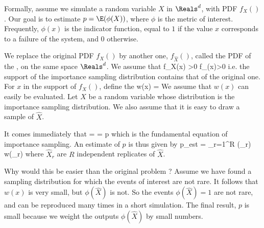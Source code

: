 Formally, assume we simulate a random variable $X$ in $\Reals^d$,
with PDF $f_X()$. Our goal is to estimate $p=\E(\phi(X))$, where
$\phi$ is the metric of interest. Frequently, $\phi(x)$ is the
indicator function, equal to $1$ if the value $x$ corresponds to a
failure of the system, and $0$ otherwise.
\begin{figure}[!htb]
  \centering
{}
   \label{fig-is-ex0}
\end{figure}
We replace the original PDF $f_X()$ by another one, $f_{\hat{X}}()$,
called the PDF of the , on the
same space $\Reals^d$. We assume that
 \ben \mif f_X(x) >0 \mthen f_{}(x)>0
 \een
 i.e. the support of the importance sampling distribution contains that of the
 original one. For $x$ in the support of $f_X()$, define the
 \be
w(x) =  \label{eq-is-wf}
 \ee
We assume that $w(x)$ can easily be evaluated. Let $\hat{X}$ be
a random variable whose distribution is the importance sampling
distribution. We also assume that it is easy to draw a sample
of $\hat{X}$.

It comes immediately that
  \be {} =  = p
  \label{eq-is-map}
  \ee
which is the fundamental equation of importance sampling. An
estimate of $p$ is thus given by
 \be p_{est} = \sum_{r=1}^R \phi(_r) w(_r)
 \ee where $\hat{X}_r$ are $R$ independent replicates of $\hat{X}$.

Why would this be easier than the original problem ? Assume we have
found a sampling distribution for which the events of interest are
not rare. It follows that $w(x)$ is very small, but $\phi(\hat{X})$
is not. So the events $\phi(\hat{X})=1$ are not rare, and can be
reproduced many times in a short simulation. The final result, $p$
is small because we weight the outputs $\phi(\hat{X})$ by small
numbers.

%
\begin{figure}[!htb]
  \centering
{}
   \label{fig-is-ex1}
\end{figure}
%

